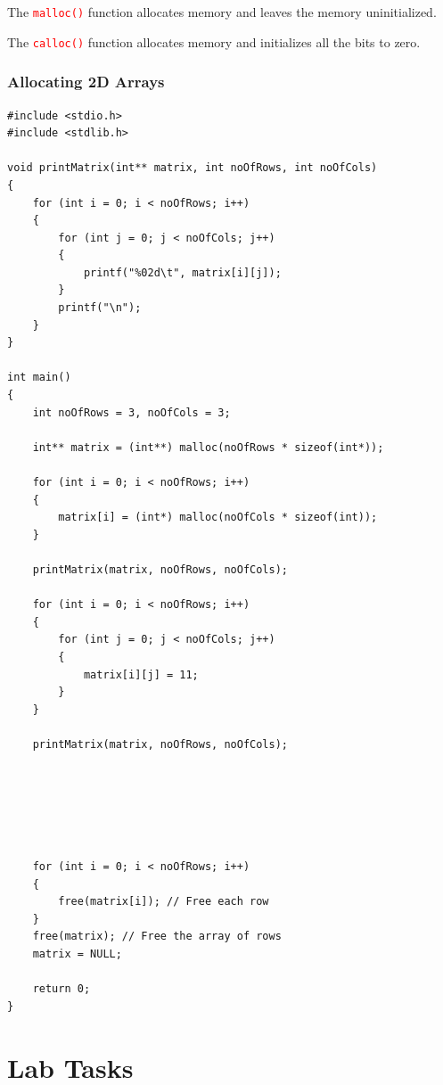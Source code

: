 \documentclass[12pt]{article}
\begin{document}
\noindent The \textcolor{red}{\texttt{malloc()}} function allocates memory and leaves the memory uninitialized. 

\noindent The \textcolor{red}{\texttt{calloc()}} function allocates memory and initializes all the bits to zero. \\

\newpage
{}
\section*{Allocating 2D Arrays}

\begin{verbatim}
#include <stdio.h>
#include <stdlib.h>

void printMatrix(int** matrix, int noOfRows, int noOfCols)
{
    for (int i = 0; i < noOfRows; i++)
    {
        for (int j = 0; j < noOfCols; j++)
        {
            printf("%02d\t", matrix[i][j]);
        }
        printf("\n");
    }
}

int main()
{
    int noOfRows = 3, noOfCols = 3;

    int** matrix = (int**) malloc(noOfRows * sizeof(int*));

    for (int i = 0; i < noOfRows; i++)
    {
        matrix[i] = (int*) malloc(noOfCols * sizeof(int));
    }

    printMatrix(matrix, noOfRows, noOfCols);

    for (int i = 0; i < noOfRows; i++)
    {
        for (int j = 0; j < noOfCols; j++)
        {
            matrix[i][j] = 11;
        }
    }

    printMatrix(matrix, noOfRows, noOfCols);






    for (int i = 0; i < noOfRows; i++)
    {
        free(matrix[i]); // Free each row
    }
    free(matrix); // Free the array of rows
    matrix = NULL;

    return 0;
}
\end{verbatim}






\newpage
{}
\part*{\centering Lab Tasks}
\end{document}
